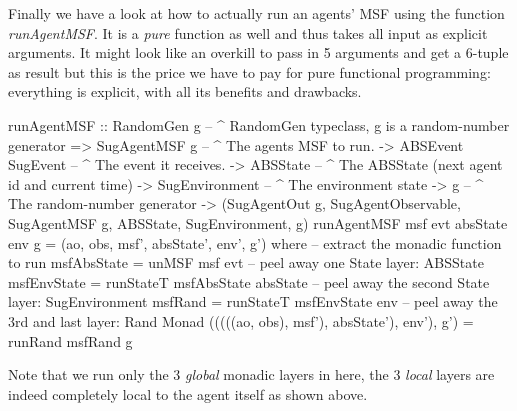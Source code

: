 Finally we have a look at how to actually run an agents' MSF using the function \textit{runAgentMSF}. It is a \textit{pure} function as well and thus takes all input as explicit arguments. It might look like an overkill to pass in 5 arguments and get a 6-tuple as result but this is the price we have to pay for pure functional programming: everything is explicit, with all its benefits and drawbacks.

\begin{HaskellCode}
runAgentMSF :: RandomGen g        -- ^ RandomGen typeclass, g is a random-number generator
            => SugAgentMSF g      -- ^ The agents MSF to run.
            -> ABSEvent SugEvent  -- ^ The event it receives.
            -> ABSState           -- ^ The ABSState (next agent id and current time)
            -> SugEnvironment     -- ^ The environment state
            -> g                  -- ^ The random-number generator
            -> (SugAgentOut g, SugAgentObservable, SugAgentMSF g, ABSState, SugEnvironment, g)
runAgentMSF msf evt absState env g = (ao, obs, msf', absState', env', g') 
  where
    -- extract the monadic function to run
    msfAbsState = unMSF msf evt
    -- peel away one State layer: ABSState
    msfEnvState = runStateT msfAbsState absState
    -- peel away the second State layer: SugEnvironment
    msfRand     = runStateT msfEnvState env
    -- peel away the 3rd and last layer: Rand Monad
    (((((ao, obs), msf'), absState'), env'), g') = runRand msfRand g
\end{HaskellCode}

Note that we run only the 3 \textit{global} monadic layers in here, the 3 \textit{local} layers are indeed completely local to the agent itself as shown above.